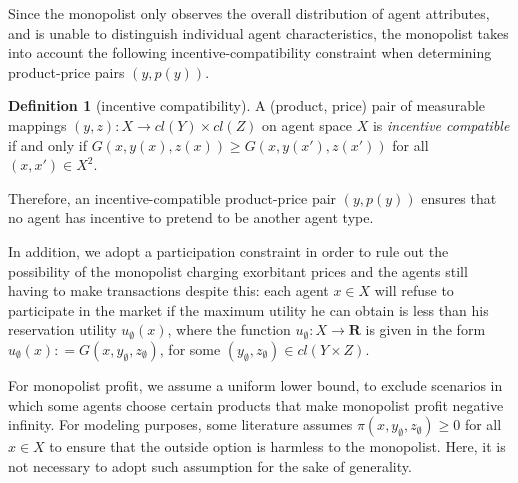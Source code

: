 \documentclass[a4paper, 11pt]{amsart}
\numberwithin{equation}{section}
\theoremstyle{plain}
\theoremstyle{definition}
\newtheorem{definition}[theorem]{Definition}
\theoremstyle{remark}
\newcommand{\R}{\mathbf{R}}
\begin{document}

{%
Since the monopolist only observes the overall distribution of agent attributes, and is unable to distinguish individual agent characteristics, the monopolist takes into account the following incentive-compatibility constraint when determining product-price pairs $(y, p(y))$.
	}

\begin{definition}[incentive compatibility]
	A (product, price) pair of measurable mappings $(y,z): X \rightarrow cl(Y) \times cl(Z)$ on agent space $X$ is \textit{incentive compatible} if and only if $G(x,y(x),z(x)) \ge G(x, y(x'), z(x'))$ for all $(x,x')\in X^2$.
\end{definition}

Therefore, an incentive-compatible product-price pair $(y, p(y))$ ensures that no agent has incentive to pretend to be another agent type.\medskip 


In addition, we adopt a participation constraint in order to rule out the possibility of the monopolist charging exorbitant prices and the agents still having to make transactions despite this: each agent $x\in X$ will refuse to participate in the market if the maximum utility he can obtain %
is less than %
his reservation utility $u_{\emptyset}(x)$, where the function $u_{\emptyset}: X \rightarrow \R$ is given in the form $u_{\emptyset}(x): = G(x, y_{\emptyset}, z_{\emptyset})$, for some $(y_{\emptyset}, z_{\emptyset}) \in cl(Y \times Z)$. \medskip

{For monopolist profit, we assume a %
	uniform lower bound, to exclude %
	scenarios in which some agents choose certain products that %
	 make monopolist profit negative infinity. For modeling purposes, some literature assumes $\pi(x, y_{\emptyset}, z_{\emptyset}) \ge  0$ for all $x\in X$ to ensure that the outside option is harmless to the monopolist. Here, it is not necessary to adopt such assumption for the sake of generality. \medskip}
\end{document}
